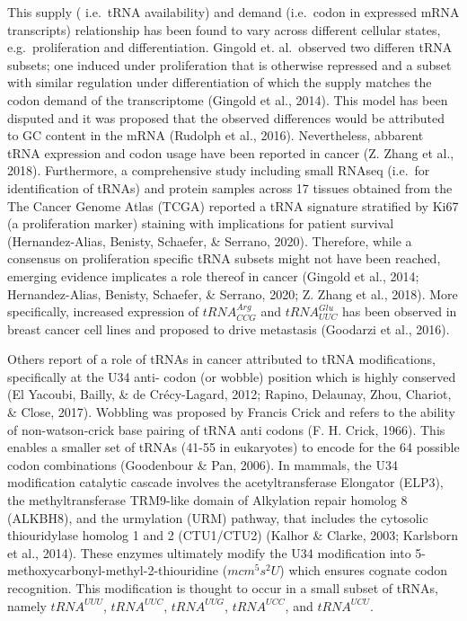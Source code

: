 \documentclass[
  12pt,
  openany]{book}
\begin{document}
This supply ( i.e.~tRNA availability) and demand (i.e.~codon in expressed mRNA transcripts) relationship has been found to vary across different cellular states, e.g.~proliferation and differentiation. Gingold et. al.~observed two differen tRNA subsets; one induced under proliferation that is otherwise repressed and a subset with similar regulation under differentiation of which the supply matches the codon demand of the transcriptome (Gingold et al., 2014). This model has been disputed and it was proposed that the observed differences would be attributed to GC content in the mRNA (Rudolph et al., 2016). Nevertheless, abbarent tRNA expression and codon usage have been reported in cancer (Z. Zhang et al., 2018). Furthermore, a comprehensive study including small RNAseq (i.e.~for identification of tRNAs) and protein samples across 17 tissues obtained from the The Cancer Genome Atlas (TCGA) reported a tRNA signature stratified by Ki67 (a proliferation marker) staining with implications for patient survival (Hernandez-Alias, Benisty, Schaefer, \& Serrano, 2020). Therefore, while a consensus on proliferation specific tRNA subsets might not have been reached, emerging evidence implicates a role thereof in cancer (Gingold et al., 2014; Hernandez-Alias, Benisty, Schaefer, \& Serrano, 2020; Z. Zhang et al., 2018). More specifically, increased expression of \(tRNA_{CCG}^{Arg}\) and \(tRNA_{UUC}^{Glu}\) has been observed in breast cancer cell lines and proposed to drive metastasis (Goodarzi et al., 2016).

Others report of a role of tRNAs in cancer attributed to tRNA modifications, specifically at the U34 anti- codon (or wobble) position which is highly conserved (El Yacoubi, Bailly, \& de Crécy-Lagard, 2012; Rapino, Delaunay, Zhou, Chariot, \& Close, 2017). Wobbling was proposed by Francis Crick and refers to the ability of non-watson-crick base pairing of tRNA anti codons (F. H. Crick, 1966). This enables a smaller set of tRNAs (41-55 in eukaryotes) to encode for the 64 possible codon combinations (Goodenbour \& Pan, 2006). In mammals, the U34 modification catalytic cascade involves the acetyltransferase Elongator (ELP3), the methyltransferase TRM9-like domain of Alkylation repair homolog 8 (ALKBH8), and the urmylation (URM) pathway, that includes the cytosolic thiouridylase homolog 1 and 2 (CTU1/CTU2) (Kalhor \& Clarke, 2003; Karlsborn et al., 2014). These enzymes ultimately modify the U34 modification into 5-methoxycarbonyl-methyl-2-thiouridine (\(mcm^5s^2U\)) which ensures cognate codon recognition. This modification is thought to occur in a small subset of tRNAs, namely \(tRNA^{UUU}\), \(tRNA^{UUC}\), \(tRNA^{UUG}\), \(tRNA^{UCC}\), and \(tRNA^{UCU}\).
\end{document}
